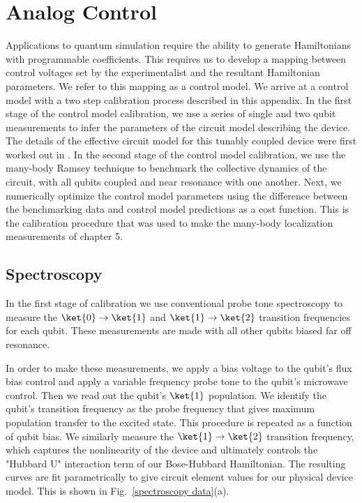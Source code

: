\chapter[Analog Control]{Analog Control}

Applications to quantum simulation require the ability to generate Hamiltonians with programmable coefficients.
This requires us to develop a mapping between control voltages set by the experimentalist and the resultant Hamiltonian parameters.
We refer to this mapping as a control model.
We arrive at a control model with a two step calibration process described in this appendix.
In the first stage of the control model calibration, we use a series of single and two qubit measurements to infer
the parameters of the circuit model describing the device.  The details of the effective circuit model for this tunably coupled device were first worked out in \cite{Neill2018}.
In the second stage of the control model calibration, we use the many-body Ramsey technique to benchmark the collective
dynamics of the circuit, with all qubits coupled and near resonance with one another.
Next, we numerically optimize the control model parameters using the difference between the benchmarking data and control model predictions as a cost function.
This is the calibration procedure that was used to make the many-body localization measurements of chapter 5.

\section{Spectroscopy \label{sec:spectroscopy}}

In the first stage of calibration we use conventional probe tone spectroscopy to measure
the $\ket{0} \rightarrow \ket{1}$ and $\ket{1} \rightarrow \ket{2}$ transition frequencies for each qubit.
These measurements are made with all other qubits biased far off resonance.

In order to make these measurements, we apply a bias voltage to the qubit's flux bias control
and apply a variable frequency probe tone to the qubit's microwave control.
Then we read out the qubit's $\ket{1}$ population.
We identify the qubit's transition frequency as the probe frequency that gives maximum population transfer to the excited state.
This procedure is repeated as a function of qubit bias.
We similarly measure the $\ket{1} \rightarrow \ket{2}$ transition frequency,
which captures the nonlinearity of the device and ultimately controls the "Hubbard U" interaction term of our Bose-Hubbard Hamiltonian.
The resulting curves are fit parametrically to give circuit element values for our physical device model.
This is shown in Fig.~\ref{spectroscopy data}(a).

